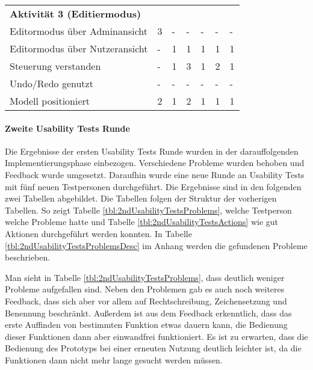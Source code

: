 \begin{table}[H]
\begin{tabular}{l|llllll}
        \textbf{Aktivität 3 (Editiermodus)} &           &           &           &           &           &           \\
        Editormodus über Adminansicht       &         3 &         - &         - &         - &         - &         - \\
        Editormodus über Nutzeransicht      &         - &         1 &         1 &         1 &         1 &         1 \\
        Steuerung verstanden                &         - &         1 &         3 &         1 &         2 &         1 \\
        Undo/Redo genutzt                   &         - &         - &         - &         - &         - &         - \\
        Modell positioniert                 &         2 &         1 &         2 &         1 &         1 &         1 \\
    \end{tabular}
\end{table}


\paragraph{Zweite Usability Tests Runde}

Die Ergebnisse der ersten Usability Tests Runde wurden in der darauffolgenden Implementierungsphase einbezogen. Verschiedene Probleme wurden behoben und Feedback wurde umgesetzt. Daraufhin wurde eine neue Runde an Usability Tests mit fünf neuen Testpersonen durchgeführt. Die Ergebnisse sind in den folgenden zwei Tabellen abgebildet. Die Tabellen folgen der Struktur der vorherigen Tabellen. So zeigt Tabelle \ref{tbl:2ndUsabilityTestsProblems}, welche Testperson welche Probleme hatte und Tabelle \ref{tbl:2ndUsabilityTestsActions} wie gut Aktionen durchgeführt werden konnten. In Tabelle \ref{tbl:2ndUsabilityTestsProblemsDesc} im Anhang werden die gefundenen Probleme beschrieben. 

Man sieht in Tabelle \ref{tbl:2ndUsabilityTestsProblems}, dass deutlich weniger Probleme aufgefallen sind. Neben den Problemen gab es auch noch weiteres Feedback, dass sich aber vor allem auf Rechtschreibung, Zeichensetzung und Benennung beschränkt. Außerdem ist aus dem Feedback erkenntlich, dass das erste Auffinden von bestimmten Funktion etwas dauern kann, die Bedienung dieser Funktionen dann aber einwandfrei funktioniert. Es ist zu erwarten, dass die Bedienung des Prototyps bei einer erneuten Nutzung deutlich leichter ist, da die Funktionen dann nicht mehr lange gesucht werden müssen.

